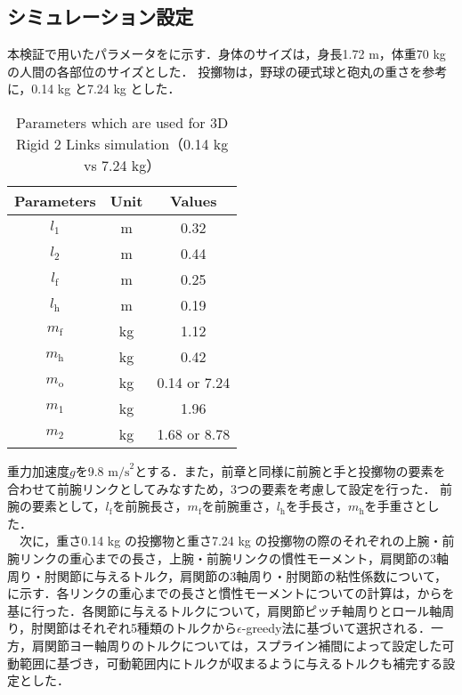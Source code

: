\subsection{シミュレーション設定}
本検証で用いたパラメータをに示す．身体のサイズは，身長1.72 m，体重70 kgの人間の各部位のサイズとした．
投擲物は，野球の硬式球と砲丸の重さを参考に，0.14 kg と7.24 kg とした．
\begin{table}[tb]
  \begin{center}
    \caption{Parameters which are used for 3D Rigid 2 Links simulation（0.14 kg vs 7.24 kg）}
    \begin{tabular}{c|c|c}
      \hline
      Parameters & Unit & Values \\
      \hline
      $l_{1}$ & m & 0.32 \\
      $l_{2}$ & m & 0.44 \\
      $l_{\mathrm{f}}$ & m & 0.25 \\
      $l_{\mathrm{h}}$ & m & 0.19 \\
      $m_{\mathrm{f}}$ & kg & 1.12 \\
      $m_{\mathrm{h}}$ & kg & 0.42 \\
      $m_{\mathrm{o}}$ & kg & 0.14 or 7.24 \\
      $m_{1}$ & kg & 1.96 \\
      $m_{2}$ & kg & 1.68 or 8.78 \\
      \hline
    \end{tabular}
  \end{center}
\end{table}
重力加速度$g$を9.8 $\mathrm{m/s}^{2}$とする．また，前章と同様に前腕と手と投擲物の要素を合わせて前腕リンクとしてみなすため，3つの要素を考慮して設定を行った．
前腕の要素として，$l_{\mathrm{f}}$を前腕長さ，$m_{\mathrm{f}}$を前腕重さ，$l_{\mathrm{h}}$を手長さ，$m_{\mathrm{h}}$を手重さとした．\\
　次に，重さ0.14 kg の投擲物と重さ7.24 kg の投擲物の際のそれぞれの上腕・前腕リンクの重心までの長さ，上腕・前腕リンクの慣性モーメント，肩関節の3軸周り・肘関節に与えるトルク，肩関節の3軸周り・肘関節の粘性係数について，に示す．各リンクの重心までの長さと慣性モーメントについての計算は，からを基に行った．各関節に与えるトルクについて，肩関節ピッチ軸周りとロール軸周り，肘関節はそれぞれ5種類のトルクから$\epsilon$-greedy法に基づいて選択される．一方，肩関節ヨー軸周りのトルクについては，スプライン補間によって設定した可動範囲に基づき，可動範囲内にトルクが収まるように与えるトルクも補完する設定とした．

